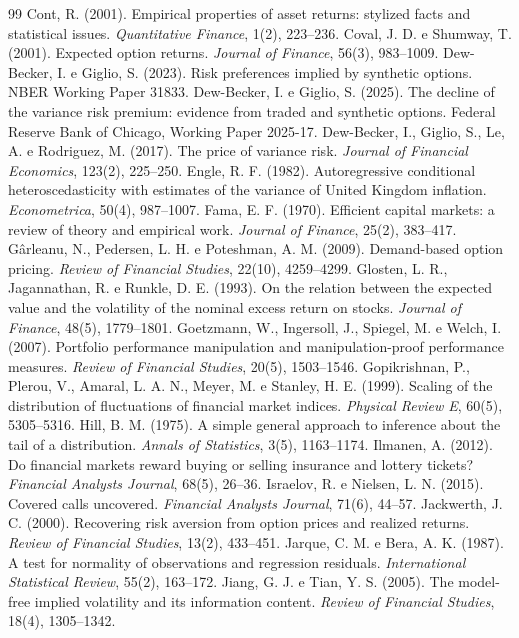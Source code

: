 \documentclass[11pt,a4paper]{article}
\begin{document}
\begin{thebibliography}{99}
\bibitem{} Cont, R. (2001). Empirical properties of asset returns: stylized facts and statistical issues. \emph{Quantitative Finance}, 1(2), 223--236.
\bibitem{} Coval, J. D. e Shumway, T. (2001). Expected option returns. \emph{Journal of Finance}, 56(3), 983--1009.
\bibitem{} Dew-Becker, I. e Giglio, S. (2023). Risk preferences implied by synthetic options. NBER Working Paper 31833.
\bibitem{} Dew-Becker, I. e Giglio, S. (2025). The decline of the variance risk premium: evidence from traded and synthetic options. Federal Reserve Bank of Chicago, Working Paper 2025-17.
\bibitem{} Dew-Becker, I., Giglio, S., Le, A. e Rodriguez, M. (2017). The price of variance risk. \emph{Journal of Financial Economics}, 123(2), 225--250.
\bibitem{} Engle, R. F. (1982). Autoregressive conditional heteroscedasticity with estimates of the variance of United Kingdom inflation. \emph{Econometrica}, 50(4), 987--1007.
\bibitem{} Fama, E. F. (1970). Efficient capital markets: a review of theory and empirical work. \emph{Journal of Finance}, 25(2), 383--417.
\bibitem{} Gârleanu, N., Pedersen, L. H. e Poteshman, A. M. (2009). Demand-based option pricing. \emph{Review of Financial Studies}, 22(10), 4259--4299.
\bibitem{} Glosten, L. R., Jagannathan, R. e Runkle, D. E. (1993). On the relation between the expected value and the volatility of the nominal excess return on stocks. \emph{Journal of Finance}, 48(5), 1779--1801.
\bibitem{} Goetzmann, W., Ingersoll, J., Spiegel, M. e Welch, I. (2007). Portfolio performance manipulation and manipulation-proof performance measures. \emph{Review of Financial Studies}, 20(5), 1503--1546.
\bibitem{} Gopikrishnan, P., Plerou, V., Amaral, L. A. N., Meyer, M. e Stanley, H. E. (1999). Scaling of the distribution of fluctuations of financial market indices. \emph{Physical Review E}, 60(5), 5305--5316.
\bibitem{} Hill, B. M. (1975). A simple general approach to inference about the tail of a distribution. \emph{Annals of Statistics}, 3(5), 1163--1174.
\bibitem{} Ilmanen, A. (2012). Do financial markets reward buying or selling insurance and lottery tickets? \emph{Financial Analysts Journal}, 68(5), 26--36.
\bibitem{} Israelov, R. e Nielsen, L. N. (2015). Covered calls uncovered. \emph{Financial Analysts Journal}, 71(6), 44--57.
\bibitem{} Jackwerth, J. C. (2000). Recovering risk aversion from option prices and realized returns. \emph{Review of Financial Studies}, 13(2), 433--451.
\bibitem{} Jarque, C. M. e Bera, A. K. (1987). A test for normality of observations and regression residuals. \emph{International Statistical Review}, 55(2), 163--172.
\bibitem{} Jiang, G. J. e Tian, Y. S. (2005). The model-free implied volatility and its information content. \emph{Review of Financial Studies}, 18(4), 1305--1342.

\end{thebibliography}
\end{document}
